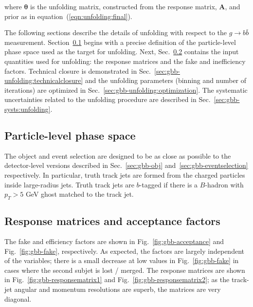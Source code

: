    
    where $\boldsymbol{\theta}$ is the unfolding matrix, constructed from the response matrix, $\mathbf{A}$, and prior as in
    equation~(\ref{eqn:unfolding:final}).

The following sections describe the details of unfolding with respect to the $g\rightarrow b\bar{b}$  measurement.  Section~\ref{sec:gbb-unfolding:fiducialdefinition} begins with a precise definition of the particle-level phase space used as the target for unfolding.  Next, Sec.~\ref{sec:gbb-unfolding:inputquantities} contains the input quantities used for unfolding: the response matrices and the fake and inefficiency factors.  Technical closure is demonstrated in Sec.~\ref{sec:gbb-unfolding:technicalclosure} and the unfolding parameters (binning and number of iterations) are optimized in Sec.~\ref{sec:gbb-unfolding:optimization}.  The systematic uncertainties related to the unfolding procedure are described in Sec.~\ref{sec:gbb-systs:unfolding}.

\subsection{Particle-level phase space}
\label{sec:gbb-unfolding:fiducialdefinition}

The object and event selection are designed to be as close as possible to the detector-level versions described in Sec.~\ref{sec:gbb-obj} and~\ref{sec:gbb-eventselection} respectively. In particular, truth track jets are formed from the charged particles inside large-radius jets.  Truth track jets are $b$-tagged if there is a $B$-hadron with $p_T>5$ GeV ghost matched to the track jet. 

\subsection{Response matrices and acceptance factors}
\label{sec:gbb-unfolding:inputquantities}

The fake and efficiency factors are shown in Fig.~\ref{fig:gbb-acceptance} and Fig.~\ref{fig:gbb-fake}, respectively.  As expected, the factors are largely independent of the variables; there is a small decrease at low values in Fig.~\ref{fig:gbb-fake} in cases where the second subjet is lost / merged.  The response matrices are shown in Fig.~\ref{fig:gbb-responsematrix1} and Fig.~\ref{fig:gbb-responsematrix2}; as the track-jet angular and momentum resolutions are superb, the matrices are very diagonal.

